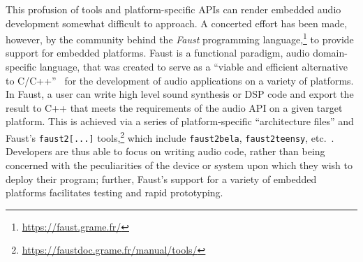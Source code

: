 \documentclass[utf8]{FrontiersinHarvard}
\begin{document}
    This profusion of tools and platform-specific APIs can render embedded audio
    development somewhat difficult to approach.
    A concerted effort has been made, however, by the community behind the
    \textit{Faust} programming language,\footnote{\url{https://faust.grame.fr/}} to
    provide support for embedded platforms.
    Faust is a functional paradigm, audio domain-specific language, that was created
    to serve as a ``viable and efficient alternative to
    C/C++''~\citep{orlarey_faust_2009} for the development of audio applications on
    a variety of platforms.
    In Faust, a user can write high level sound synthesis or DSP code and export the
    result to C++ that meets the requirements of the audio API on a given target
    platform.
    This is achieved via a series of platform-specific ``architecture files'' and
    Faust's \texttt{faust2[...]} tools,\footnote{
        \url{https://faustdoc.grame.fr/manual/tools/}
    } which include
    \texttt{faust2bela}, \texttt{faust2teensy}, etc.~\citep{michon_real_2019,
        michon_embedded_2020}.
    Developers are thus able to focus on writing audio code, rather than being
    concerned with the peculiarities of the device or system upon which they wish
    to deploy their program;
    further, Faust's support for a variety of embedded platforms facilitates testing
    and rapid prototyping.
\end{document}
